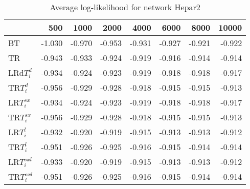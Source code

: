 \begin{table}
 \begin{center}
 \begin{tabular}{lrrrrrrr}
& 500 &  1000 & 2000 & 4000 & 6000& 8000&  10000\\\hline
BT & -1.030 & -0.970 & -0.953 & -0.931 & -0.927 & -0.921 & -0.922\\\hline
TR & -0.943 & -0.933 & -0.924 & -0.919 & -0.916 & -0.914 & -0.914\\\hline
LRd$T_i^d$ & -0.934 & -0.924 & -0.923 & -0.919 & -0.918 & -0.918 & -0.917\\\hline
TR$T_i^d$ & -0.956 & -0.929 & -0.928 & -0.918 & -0.915 & -0.915 & -0.913\\\hline
LR$T_i^{sx}$ & -0.934 & -0.924 & -0.923 & -0.919 & -0.918 & -0.918 & -0.917\\\hline
TR$T_i^{sx}$ & -0.956 & -0.929 & -0.928 & -0.918 & -0.915 & -0.915 & -0.913\\\hline
LR$T_i^l$ & -0.932 & -0.920 & -0.919 & -0.915 & -0.913 & -0.913 & -0.912\\\hline
TR$T_i^l$ & -0.951 & -0.926 & -0.925 & -0.916 & -0.915 & -0.914 & -0.914\\\hline
LR$T_i^{sxl}$ & -0.933 & -0.920 & -0.919 & -0.915 & -0.913 & -0.913 & -0.912\\\hline
TR$T_i^{sxl}$ & -0.951 & -0.926 & -0.925 & -0.916 & -0.915 & -0.914 & -0.914\\\hline
\end{tabular}
\end{center}
\caption{Average log-likelihood for network Hepar2 }
\label{Hepar2ll}
\end{table}


